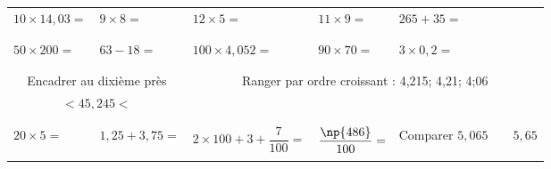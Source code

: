 \documentclass[14]{article}
\begin{document}
    \begin{tabular}{p{3cm}|p{3cm}|p{3cm}|p{3cm}|p{3cm}}
         $10\times14,03=$ & $9\times8=$ & $12\times 5 = $ & $11\times9=$ & $265+35=$\\ 
         
         & & & &\\ \hline & & & &\\
         
         $50\times 200=$ & $63-18=$ & $100\times4,052=$ &  $90\times70=$ & $3\times0,2=$\\
         
         & & & &\\ \hline \multicolumn{2}{c|}{} & \multicolumn{2}{c}{}\\
         
         \multicolumn{2}{c|}{Encadrer au dixième près} & 
         \multicolumn{3}{c}{Ranger par ordre croissant : 4,215; 4,21; 4;06 }\\[2ex]
         
         \multicolumn{2}{c|}{$ \quad \quad < 45,245 < \quad \quad $} & 
         \multicolumn{3}{c}{}\\

        \multicolumn{2}{c|}{} & \multicolumn{2}{c}{} \\ \hline & & & &\\

        $20 \times 5=$ & $1,25+3,75=$ & $2\times100+3+\dfrac{7}{100}=$ & $ \dfrac{\np{486}}{100}=$ & Comparer $5,065 \quad\quad  5,65$ \\

        & & & &\\ 
    \end{tabular}

\bigskip

\enteteActivite{\monTitre}{\theserie}
\end{document}
